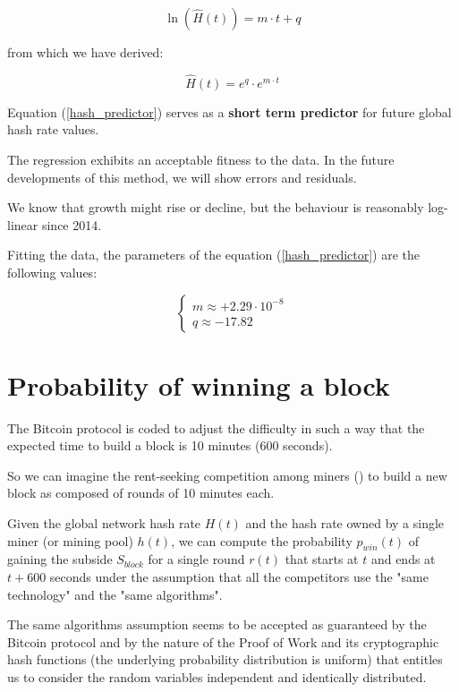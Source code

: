 \documentclass{book}
\theoremstyle{definition}
\begin{document}
\begin{equation}
    \ln(\widehat{H}(t)) = m \cdot t + q  \label{eq1}
\end{equation}

from which we have derived:

\begin{equation}
    \widehat{H}(t) = e^{q} \cdot e^{m \cdot t} \label{hash_predictor}
\end{equation}

Equation (\ref{hash_predictor}) serves as a \textbf{short term predictor} for future global hash rate values.

The regression exhibits an acceptable fitness to the data. In the future developments of this method, we will show errors and residuals.

We know that growth might rise or decline, but the behaviour is reasonably log-linear since 2014.

Fitting the data, the parameters of the equation (\ref{hash_predictor}) are the following values:

\begin{equation}
    \left \{
        \begin{array}{ll}
            m \approx +2.29 \cdot 10^{-8} \\
            q \approx -17.82
        \end{array}
    \right. \label{values}
\end{equation}

\section{Probability of winning a block}

The Bitcoin protocol is coded to adjust the difficulty in such a way that the expected time to build a block is 10 minutes (600 seconds).

So we can imagine the rent-seeking competition among miners (\cite{theEconomicLimits}) to build a new block as composed of rounds of 10 minutes each.

Given the global network hash rate $H(t)$ and the hash rate owned by a single miner (or mining pool) $h(t)$, we can compute the probability $p_{win}(t)$ of gaining the subside $S_{block}$ for a single round $r(t)$ that starts at $t$ and ends at $t+600$ seconds under the assumption that all the competitors use the "same technology" and the "same algorithms".

The same algorithms assumption seems to be accepted as guaranteed by the Bitcoin protocol and by the nature of the Proof of Work and its cryptographic hash functions (the underlying probability distribution is uniform) that entitles us to consider the random variables independent and identically distributed.
\end{document}
